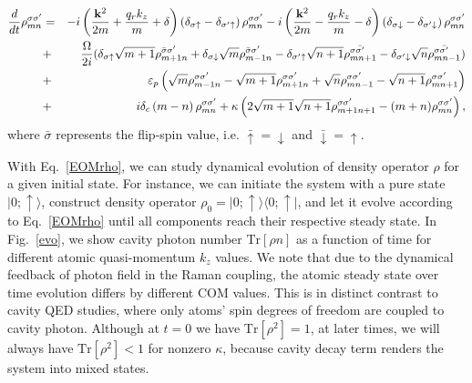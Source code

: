 \documentclass[atoms,article,submit,moreauthors,pdftex,12pt,a4paper]{mdpi}
\def\ba{\begin{eqnarray}}
\def\ea{\end{eqnarray}}
\begin{document}
\ba 
\frac{d}{dt}\rho_{mn}^{\sigma\sigma'} 
& = & -i\left(\frac{{\bf k}^{2}}{2m}+\frac{q_{r}k_{z}}{m}+\delta\right)\left(\delta_{\sigma\uparrow}-\delta_{\sigma'\uparrow}\right)\rho_{mn}^{\sigma\sigma'}
-  i\left(\frac{{\bf k}^{2}}{2m}-\frac{q_{r}k_{z}}{m}-\delta\right)\left(\delta_{\sigma\downarrow}-\delta_{\sigma'\downarrow}\right)\rho_{mn}^{\sigma\sigma'}\nonumber\\
& + & \frac{\Omega}{2i}(\delta_{\sigma\uparrow}\sqrt{m+1}\rho_{m+1n}^{\bar{\sigma}\sigma'}
+\delta_{\sigma\downarrow}\sqrt{m}\rho_{m-1n}^{\bar{\sigma}\sigma'}
-\delta_{\sigma'\uparrow}\sqrt{n+1}\rho_{mn+1}^{\sigma\bar{\sigma'}}
-\delta_{\sigma'\downarrow}\sqrt{n}\rho_{mn-1}^{\sigma\bar{\sigma'}})\nonumber\\
& + & \varepsilon_{p}\left(\sqrt{m}\rho_{m-1n}^{\sigma\sigma'}-\sqrt{m+1}\rho_{m+1n}^{\sigma\sigma'}+\sqrt{n}\rho_{mn-1}^{\sigma\sigma'}-\sqrt{n+1}\rho_{mn+1}^{\sigma\sigma'}\right)\nonumber\\
& + & i\delta_{c}\left(m-n\right)\rho_{mn}^{\sigma\sigma'}
+ \kappa\left(2\sqrt{m+1}\sqrt{n+1}\rho_{m+1n+1}^{\sigma\sigma'}-(m+n)\rho_{mn}^{\sigma\sigma'}\right),\label{EOMrho}
\ea
where $\bar{\sigma}$ represents the flip-spin value, i.e. $\bar{\uparrow}=\downarrow$ and $\bar{\downarrow}=\uparrow$. 

With Eq.~\ref{EOMrho}, we can study dynamical evolution of density operator $\rho$ for a given initial state. For instance, we can initiate the system with a pure state $|0;\uparrow\rangle$, construct density operator $\rho_0=|0;\uparrow\rangle\langle0;\uparrow|$, and let it evolve according to Eq.~\ref{EOMrho} until all components reach their respective steady state. In Fig.~\ref{evo}, we show cavity photon number $\text{Tr}[\rho n]$ as a function of time for different atomic quasi-momentum $k_z$ values. We note that due to the dynamical feedback of photon field in the Raman coupling, the atomic steady state over time evolution differs by different COM values. This is in distinct contrast to cavity QED studies, where only atoms' spin degrees of freedom are coupled to cavity photon.  Although at $t=0$ we have $\text{Tr}[\rho^2]=1$, at later times, we will always have $\text{Tr}[\rho^2]<1$ for nonzero $\kappa$, because cavity decay term renders the system into mixed states. 
\end{document}
